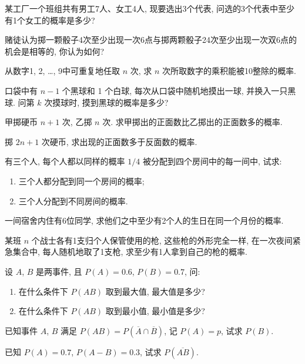 \begin{xiti}
  \item 某工厂一个班组共有男工7人、女工4人,
  现要选出3个代表,
  问选的3个代表中至少有1个女工的概率是多少?

  \item 赌徒认为掷一颗骰子4次至少出现一次6点与掷两颗骰子24次至少出现一次双6点的机会是相等的,
  你认为如何?

  \item 从数字1, 2, \dots, 9中可重复地任取 $n$ 次,
  求 $n$ 次所取数字的乘积能被10整除的概率.

  \item 口袋中有 $n-1$ 个黑球和 1 个白球,
  每次从口袋中随机地摸出一球,
  并换入一只黑球.
  问第 $k$ 次摸球时,
  摸到黑球的概率是多少?

  \item 甲掷硬币 $n+1$ 次,
  乙掷 $n$ 次.
  求甲掷出的正面数比乙掷出的正面数多的概率.

  \item 掷 $2n+1$ 次硬币,
  求出现的正面数多于反面数的概率.

  \item 有三个人,
  每个人都以同样的概率 $1/4$ 被分配到四个房间中的每一间中,
  试求:
  \begin{enumerate}
    \item 三个人都分配到同一个房间的概率;
    \item 三个人分配到不同房间的概率.
  \end{enumerate}

  \item 一间宿舍内住有6位同学,
  求他们之中至少有2个人的生日在同一个月份的概率.

  \item 某班 $n$ 个战士各有1支归个人保管使用的枪,
  这些枪的外形完全一样,
  在一次夜间紧急集合中,
  每人随机地取了1支枪,
  求至少有1人拿到自己的枪的概率.

  \item 设 $A$, $B$ 是两事件,
  且 $P(A) = 0.6$,
  $P(B) = 0.7$,
  问:
  \begin{enumerate}
    \item 在什么条件下 $P(AB)$ 取到最大值,
    最大值是多少?
    \item 在什么条件下 $P(AB)$ 取到最小值,
    最小值是多少?
  \end{enumerate}

  \item 已知事件 $A$, $B$ 满足 $P(AB) = P(\overline{A} \cap \overline{B})$,
  记 $P(A) = p$,
  试求 $P(B)$.

  \item 已知 $P(A) = 0.7$,
  $P(A-B) = 0.3$,
  试求 $P(\overline{AB})$.


\end{xiti}
